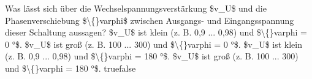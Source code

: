     {Was lässt sich über die Wechselspannungsverstärkung \$v\_U\$ und die Phasenverschiebung \$\textbackslash\{\}varphi\$ zwischen Ausgangs- und Eingangsspannung dieser Schaltung aussagen?}
    {\$v\_U\$ ist klein (z. B. 0,9 ... 0,98) und \$\textbackslash\{\}varphi = 0 °\$.}
    {\$v\_U\$ ist groß (z. B. 100 ... 300) und \$\textbackslash\{\}varphi = 0 °\$.}
    {\$v\_U\$ ist klein (z. B. 0,9 ... 0,98) und \$\textbackslash\{\}varphi = 180 °\$.}
    {\$v\_U\$ ist groß (z. B. 100 ... 300) und \$\textbackslash\{\}varphi = 180 °\$.}
    {true}{false}